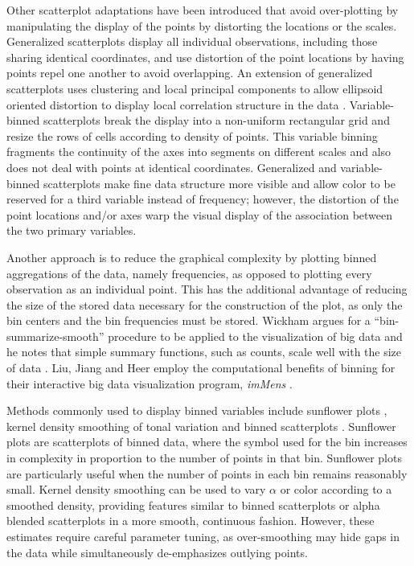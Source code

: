 \documentclass[11pt]{isuthesis}\usepackage[]{graphicx}\usepackage[]{color}
\begin{document}
Other scatterplot adaptations have been introduced that avoid over-plotting by manipulating the display of the points by distorting the locations or the scales. Generalized scatterplots \citep{Keim2010GenScatter} display all individual observations, including those sharing identical coordinates, and use distortion of the point locations by having points repel one another to avoid overlapping. An extension of generalized scatterplots uses clustering and local principal components to allow ellipsoid oriented distortion to display local correlation structure in the data \citep{Janetzko2013Ellipse}. Variable-binned scatterplots \citep{Hao2010visual} break the display into a non-uniform rectangular grid and resize the rows of cells according to density of points. This variable binning fragments the continuity of the axes into segments on different scales and also does not deal with points at identical coordinates. Generalized and variable-binned scatterplots make fine data structure more visible and allow color to be reserved for a third variable instead of frequency; however, the distortion of the point locations and/or axes warp the visual display of the association between the two primary variables.

Another approach is to reduce the graphical complexity by plotting binned aggregations of the data, namely frequencies, as opposed to plotting every observation as an individual point. This has the additional advantage of reducing the size of the stored data necessary for the construction of the plot, as only the bin centers and the bin frequencies must be stored. Wickham argues for a ``bin-summarize-smooth'' procedure to be applied to the visualization of big data and he notes that simple summary functions, such as counts, scale  well with the size of data \citep{Wickham2013Bin}. Liu, Jiang and Heer employ the computational benefits of binning for their interactive big data visualization program, \textit{imMens} \citep{Liu2013imMens}.  

Methods commonly used to display binned variables include sunflower plots \citep{sunflowerplots}, kernel density smoothing of tonal variation and binned scatterplots \citep{martin-gold}. Sunflower plots are scatterplots of binned data, where the symbol used for the bin increases in complexity in proportion to the number of points in that bin. Sunflower plots are particularly useful when the number of points in each bin remains reasonably small. Kernel density smoothing can be used to vary $\alpha$ or color according to a smoothed density, providing features similar to binned scatterplots or alpha blended scatterplots in a more smooth, continuous fashion. However, these estimates require careful parameter tuning, as over-smoothing may hide gaps in the data while simultaneously de-emphasizes outlying points.
\end{document}
